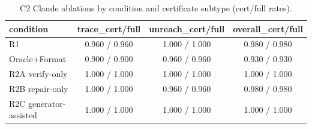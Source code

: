 \begin{table}[t]
\centering
\caption{C2 Claude ablations by condition and certificate subtype (cert/full rates).}
\label{tab:c2-ablations}
\begin{tabular}{lccc}
\toprule
condition & trace\_cert/full & unreach\_cert/full & overall\_cert/full \\
\midrule
R1 & 0.960 / 0.960 & 1.000 / 1.000 & 0.980 / 0.980 \\
Oracle+Format & 0.900 / 0.900 & 0.960 / 0.960 & 0.930 / 0.930 \\
R2A verify-only & 1.000 / 1.000 & 1.000 / 1.000 & 1.000 / 1.000 \\
R2B repair-only & 1.000 / 1.000 & 0.960 / 0.960 & 0.980 / 0.980 \\
R2C generator-assisted & 1.000 / 1.000 & 1.000 / 1.000 & 1.000 / 1.000 \\
\bottomrule
\end{tabular}
\end{table}
